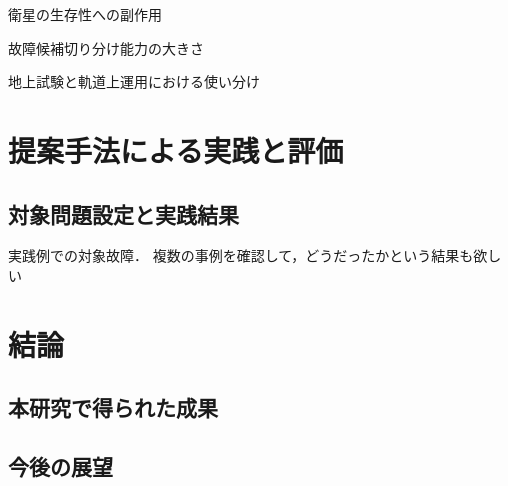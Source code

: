 \documentclass[11pt]{jsarticle}%
\begin{document}
\begin{multicols}{2}
  衛星の生存性への副作用

  故障候補切り分け能力の大きさ

  地上試験と軌道上運用における使い分け

  \section{提案手法による実践と評価}
  \subsection{対象問題設定と実践結果}
  実践例での対象故障．
  複数の事例を確認して，どうだったかという結果も欲しい

  \subsection{}

  \section{結論}
  \subsection{本研究で得られた成果}
  
  \subsection{今後の展望}
  


  
   


\end{multicols}
\end{document}
